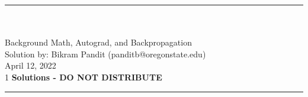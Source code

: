 \documentclass[a4paper,10pt]{article}
\def\solutions{0}
\begin{document}

\sffamily



\begin{center}
\noindent\rule{\textwidth}{1pt}\\[10pt]
{\color{blue!60}{AI535 Deep Learing -- Homework 1}}\\[10pt]
{\LARGE Background Math,  Autograd, and Backpropagation}\\[10pt]
{Solution by: Bikram Pandit (panditb@oregonstate.edu)}\\
{April 12, 2022}\\
\if\solutions1
\textbf{\color{red} \large Solutions - DO NOT DISTRIBUTE}
\fi
\noindent\rule{\textwidth}{1pt}
\end{center}
\end{document}
